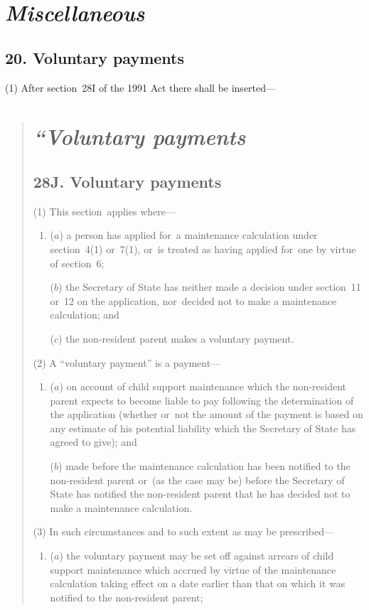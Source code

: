 \documentclass[12pt,a4paper]{article}
\begin{document}
\section{\itshape Miscellaneous}

\subsection{20. Voluntary payments}

(1) After section~28I of the 1991 Act there shall be inserted—
\begin{quotation}
\section*{\itshape “Voluntary payments}

\subsection*{28J. Voluntary payments}

(1) This section~applies where—
\begin{enumerate}\item[]
($a$) a person has applied for~a maintenance calculation under section~4(1)  or~7(1), or~is treated as having applied for~one by virtue of section~6;

($b$) the Secretary of State has neither made a decision under section~11 or~12 on the application, nor~decided not to make a maintenance calculation; and

($c$) the non-resident parent makes a voluntary payment.
\end{enumerate}

(2) A “voluntary payment” is a payment—
\begin{enumerate}\item[]
($a$) on account of child support maintenance which the non-resident parent expects to become liable to pay following the determination of the application (whether or~not the amount of the payment is based on any estimate of his potential liability which the Secretary of State has agreed to give); and

($b$) made before the maintenance calculation has been notified to the non-resident parent or~(as the case may be) before the Secretary of State has notified the non-resident parent that he has decided not to make a maintenance calculation.
\end{enumerate}

(3) In such circumstances and to such extent as may be prescribed—
\begin{enumerate}\item[]
($a$) the voluntary payment may be set off against arrears of child support maintenance which accrued by virtue of the maintenance calculation taking effect on a date earlier than that on which it was notified to the non-resident parent;


\end{enumerate}
\end{quotation}
\end{document}
